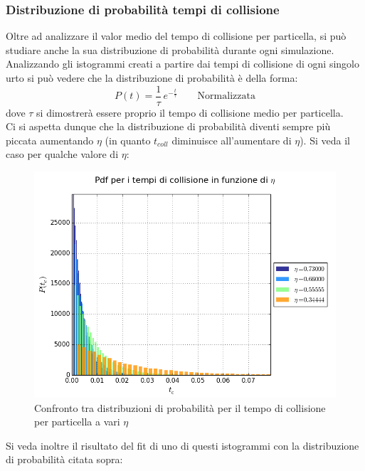 \subsubsection{Distribuzione di probabilità tempi di collisione}
Oltre ad analizzare il valor medio del tempo di collisione per particella, si può studiare anche la sua distribuzione di probabilità durante ogni simulazione.\\
Analizzando gli istogrammi creati a partire dai tempi di collisione di ogni singolo urto si può vedere che la distribuzione di probabilità è della forma:
$$
	P(t) = \frac{1}{\tau} \, e^{-\frac{t}{\tau}} \qquad \mbox{Normalizzata}
$$ 
dove $\tau$ si dimostrerà essere proprio il tempo di collisione medio per particella.\\
Ci si aspetta dunque che la distribuzione di probabilità diventi sempre più piccata aumentando $\eta$ (in quanto $t_{coll}$ diminuisce all'aumentare di $\eta$).
Si veda il caso per qualche valore di $\eta$:
\begin{center}
	\begin{figure}[h]
	\centering
		\includegraphics[scale=0.5]{sfere2D/pdf_tc.png}
	\caption{Confronto tra distribuzioni di probabilità per il tempo di collisione per particella a vari $\eta$}
	\end{figure}
\end{center}

Si veda inoltre il risultato del fit di uno di questi istogrammi con la distribuzione di probabilità citata sopra:

